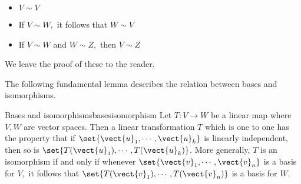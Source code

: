 \begin{itemize}
\item $V\sim V$

\item If $V\sim W,$ it follows that $W\sim V$

\item If $V\sim W$ and $W\sim Z,$ then $V\sim Z$
\end{itemize}

We leave the proof of these to the reader. 

The following fundamental lemma describes the relation between bases and
isomorphisms.

\begin{lemma}{Bases and isomorphisms}{basesisomorphism}
Let $T:V\rightarrow W$ be a
 linear map where $V,W$ are vector spaces.  Then a linear transformation $T$ which is one to one has the property that
if $\set{\vect{u}_{1},\cdots ,\vect{u}_{k}} $ is linearly
independent, then so is $\set{T(\vect{u}_{1}),\cdots ,T(\vect{u}_{k})} $.
 More generally, $T$ is an
isomorphism if and only if whenever $\set{
\vect{v}_{1},\cdots ,\vect{v}_{n}} $ is a basis for $V,$ it follows
that $\set{T(\vect{v}_{1}),\cdots ,T(\vect{v}_{n})} $ is a basis for $W$.
\end{lemma}

